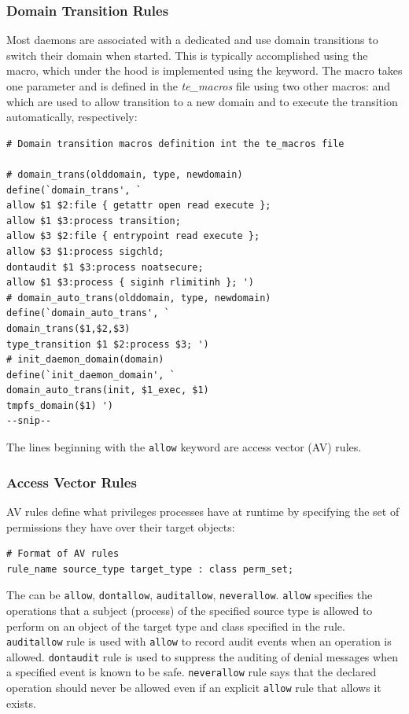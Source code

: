 \subsubsection{Domain Transition Rules}

Most daemons are associated with a dedicated and use domain transitions to switch their domain when started. This is typically accomplished using the  macro, which under the hood is implemented using the  keyword. The  macro takes one parameter and is defined in the \textit{te\_macros} file using two other macros:  and  which are used to allow transition to a new domain and to execute the transition automatically, respectively:
\begin{lstlisting}
# Domain transition macros definition int the te_macros file

# domain_trans(olddomain, type, newdomain) 
define(`domain_trans', ` 
allow $1 $2:file { getattr open read execute }; 
allow $1 $3:process transition; 
allow $3 $2:file { entrypoint read execute }; 
allow $3 $1:process sigchld; 
dontaudit $1 $3:process noatsecure; 
allow $1 $3:process { siginh rlimitinh }; ')
# domain_auto_trans(olddomain, type, newdomain) 
define(`domain_auto_trans', ` 
domain_trans($1,$2,$3) 
type_transition $1 $2:process $3; ')
# init_daemon_domain(domain) 
define(`init_daemon_domain', ` 
domain_auto_trans(init, $1_exec, $1) 
tmpfs_domain($1) ') 
--snip--
\end{lstlisting}
The lines beginning with the \texttt{allow} keyword are access vector (AV) rules.

\subsubsection{Access Vector Rules}

AV rules define what privileges processes have at runtime by specifying the set of permissions they have over their target objects:
\begin{lstlisting}
# Format of AV rules
rule_name source_type target_type : class perm_set;
\end{lstlisting}

The  can be \texttt{allow}, \texttt{dontallow}, \texttt{auditallow}, \texttt{neverallow}. 
\texttt{allow} specifies the operations that a subject (process) of the specified source type is allowed to perform on an object of the target type and class specified in the rule.
\texttt{auditallow} rule is used with \texttt{allow} to record audit events when an operation is allowed.
\texttt{dontaudit} rule is used to suppress the auditing of denial messages when a specified event is known to be safe.
\texttt{neverallow} rule says that the declared operation should never be allowed even if an explicit \texttt{allow} rule that allows it exists.

